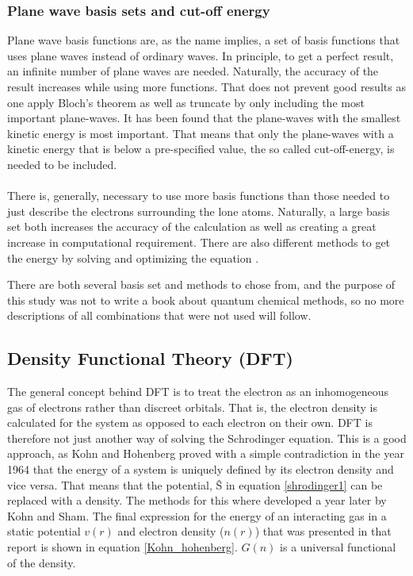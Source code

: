 \documentclass[10pt,a4paper]{article}
\begin{document}
\subsubsection{Plane wave basis sets and cut-off energy}
Plane wave basis functions are, as the name implies, a set of basis functions that uses plane waves instead of ordinary waves. In principle, to get a perfect result, an infinite number of plane waves are needed. Naturally, the accuracy of the result increases while using more functions. That does not prevent good results as one apply Bloch's theorem as well as truncate by only including the most important plane-waves. It has been found that the plane-waves with the smallest kinetic energy is most important. That means that only the plane-waves with a kinetic energy that is below a pre-specified value, the so called cut-off-energy, is needed to be included. 

\paragraph*{}
There is, generally, necessary to use more basis functions than those needed to just describe the electrons surrounding the lone atoms. Naturally, a large basis set both increases the accuracy of the calculation as well as creating a great increase in computational requirement.  There are also different methods to get the energy by solving and optimizing the equation \cite{computionalprimer}.

There are both several basis set and methods to chose from, and the purpose of this study was not to write a book about quantum chemical methods, so no more descriptions of all combinations that were not used will follow.

\subsection{Density Functional Theory (DFT)}
The general concept behind DFT is to treat the electron as an inhomogeneous gas of electrons rather than discreet orbitals. That is, the electron density is calculated for the system as opposed to each electron on their own. DFT is therefore not just another way of solving the Schrodinger equation. \cite{burke} This is a good approach, as Kohn and Hohenberg proved with a simple contradiction  in the year 1964 that the energy of a system is uniquely defined by its electron density and vice versa.  That means that the potential, \^{S} in equation \ref{shrodinger1} can be replaced with a density. The methods for this where developed a year later by Kohn and Sham. The final expression for the energy of an interacting gas in a static potential $v(r)$ and electron density ($n(r)$) that was presented in that report is shown in equation \ref{Kohn_hohenberg}. $G(n)$ is a universal functional of the density.   
\end{document}
